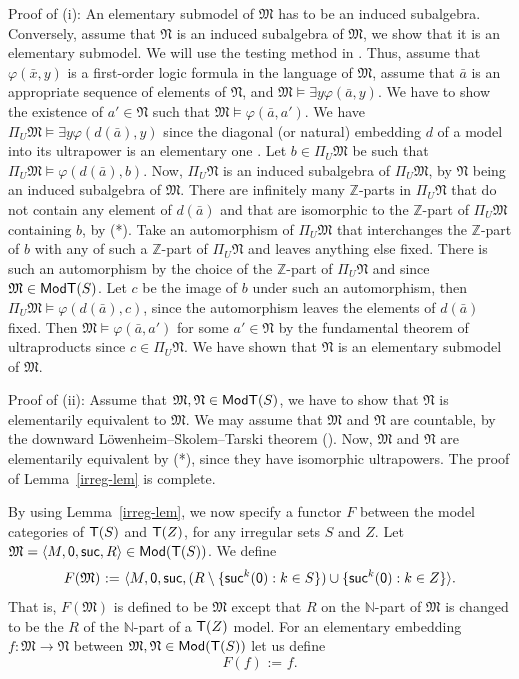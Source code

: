 \documentclass[12pt,leqno]{article}
\newcommand{\de}{\mbox{\ :=\ }}
\newcommand{\Mm}{\mbox{$\mathfrak M$}}
\newcommand{\Nn}{\mbox{$\mathfrak N$}}
\newcommand{\T}{\mbox{\sf T}}
\newcommand{\Mod}{\mbox{\sf Mod}}
\newcommand{\N}{\mathbb N}
\newcommand{\Z}{\mathbb Z}
\newcommand{\zero}{\mbox{\sf 0}}
\newcommand{\suc}{\mbox{\sf suc}}
\begin{document}
Proof of (i): An  elementary submodel of $\Mm$ has to be an
induced subalgebra. Conversely, assume that $\Nn$ is an induced
subalgebra of $\Mm$, we show that it is an elementary submodel.
We will use the testing method in \cite[Prop.3.1.2]{CK}. Thus,
assume that $\varphi(\bar{x},y)$ is a first-order logic formula in
the language of $\Mm$, assume that $\bar{a}$ is an appropriate
sequence of elements of $\Nn$, and $\Mm\models\exists
y\varphi(\bar{a},y)$. We have to show the existence of $a'\in\Nn$
such that $\Mm\models\varphi(\bar{a},a')$. We have $\Pi_U\Mm\models\exists y\varphi(d(\bar{a}),y)$ since the diagonal (or
natural) embedding $d$ of a model into its ultrapower is an
elementary one \cite[Cor.4.1.13]{CK}. Let $b\in\Pi_U\Mm$ be
such that $\Pi_U\Mm\models\varphi(d(\bar{a}),b)$.
%
Now, $\Pi_U\Nn$ is an induced subalgebra of $\Pi_U\Mm$, by
$\Nn$ being an induced subalgebra of $\Mm$. There are infinitely
many $\Z$-parts in $\Pi_U\Nn$ that do not contain any element
of $d(\bar{a})$ and that are isomorphic to the $\Z$-part of
$\Pi_U\Mm$ containing $b$, by (*). Take an automorphism of
$\Pi_U\Mm$ that interchanges the $\Z$-part of $b$ with any of
such a $\Z$-part of $\Pi_U\Nn$ and leaves anything else fixed.
There is such an automorphism by the choice of the $\Z$-part of
$\Pi_U\Nn$ and since $\Mm\in\Mod\T(S)$. Let $c$ be the
image of $b$ under such an automorphism, then $\Pi_U\Mm\models\varphi(d(\bar{a}),c)$, since the automorphism leaves the
elements of $d(\bar{a})$ fixed. Then $\Mm\models\varphi(\bar{a},a')$
for some $a'\in\Nn$ by the fundamental theorem of ultraproducts
\cite[Thm.4.1.9(ii)]{CK} since $c\in\Pi_U\Nn$. We have shown
that $\Nn$ is an elementary submodel of $\Mm$. 

Proof of (ii): Assume that $\Mm,\Nn\in\Mod\T(S)$, we have to show that $\Nn$ is elementarily
equivalent to $\Mm$. We may assume that $\Mm$ and $\Nn$ are
countable, by the downward L\"owenheim--Skolem--Tarski theorem
(\cite[Cor.2.1.4]{CK}). Now, $\Mm$ and $\Nn$ are elementarily
equivalent by (*), since they have isomorphic ultrapowers.
 The proof of
Lemma~\ref{irreg-lem} is complete. 
\bigskip

By using Lemma~\ref{irreg-lem}, we now specify a functor $F$ between
the model categories of $\T(S)$ and $\T(Z)$, for any irregular sets $S$ and $Z$.
%
Let $\Mm=\langle M, \zero, \suc, R\rangle\in\Mod(\T(S))$.
We define
\[ F(\Mm)\de\langle M, \zero, \suc, (R\setminus\{\suc^{k}(\zero) : k\in S\})\cup\{\suc^{k}(\zero) : k\in Z\}\rangle .\]
That is, $F(\Mm)$ is defined to be $\Mm$ except that $R$ on the $\N$-part of $\Mm$ is
changed to be the $R$ of the $\N$-part of a $\T(Z)$ model. For an elementary embedding $f:\Mm\to\Nn$ between $\Mm,\Nn\in\Mod(\T(S))$ let us define
\[ F(f)\de f.\]
\end{document}
